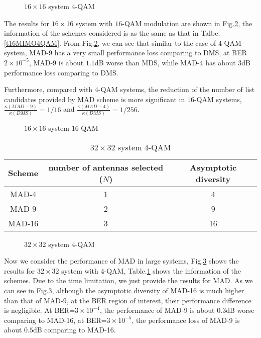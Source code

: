 \documentclass[12pt, draftclsnofoot, onecolumn]{IEEEtran}
\begin{document}
\begin{figure}[htb]
\centering
\def\svgwidth{\columnwidth}

\caption{$16\times 16$ system $4$-QAM}
\label{f16MIMO4QAM}
\end{figure}

The results for $16\times 16$ system with $16$-QAM modulation are shown in Fig.\ref{f16MIMO16QAM}, the information of the schemes considered is as the same as that in Talbe.\ref{t16MIMO4QAM}. From Fig.\ref{f16MIMO16QAM}, we can see that similar to the case of $4$-QAM system, MAD-9 has a very small performance loss comparing to DMS, at BER $2\times 10^{-5}$, MAD-9 is about $1.1$dB worse than MDS, while MAD-4 has about $3$dB  performance loss comparing to DMS.

Furthermore, compared with $4$-QAM systems, the reduction of the number of list candidates provided by MAD scheme is more significant in $16$-QAM systems, $\frac{\kappa(MAD-9)}{\kappa(DMS)}=1/16$ and $\frac{\kappa(MAD-4)}{\kappa(DMS)}=1/256$.
\begin{figure}[htb]
\centering
\def\svgwidth{\columnwidth}

\caption{$16\times 16$ system $16$-QAM}
\label{f16MIMO16QAM}
\end{figure}


\begin{table}[htb]
\renewcommand{\arraystretch}{1.3}
\caption{$32\times 32$ system $4$-QAM}
\label{t32MIMO4QAM}
\centering
\begin{tabular}{|c|c|c|}
\hline
Scheme&number of antennas selected ($N$)&Asymptotic diversity\\
\hline 
MAD-4&1&4\\
\hline
MAD-9&2&9\\
\hline
MAD-16&3&16\\
\hline
\end{tabular}
\end{table}

\begin{figure}[htb]
\centering
\def\svgwidth{\columnwidth}

\caption{$32\times 32$ system $4$-QAM}
\label{f32MIMO4QAM}
\end{figure}
Now we consider the performance of MAD in large systems, Fig.\ref{f32MIMO4QAM} shows the results for $32\times 32$ system with $4$-QAM, Table.\ref{t32MIMO4QAM} shows the information of the schemes. Due to the time limitation, we just provide the results for MAD. As we can see in Fig.\ref{f32MIMO4QAM}, although the asymptotic diversity of MAD-16 is much higher than that of MAD-9, at the BER region of interest, their performance difference is negligible. At BER=$3\times 10^{-4}$, the performance of MAD-9 is about $0.3$dB worse comparing to MAD-16, at BER=$3\times 10^{-5}$, the performance loss of MAD-9 is about $0.5$dB comparing to MAD-16.
\end{document}
